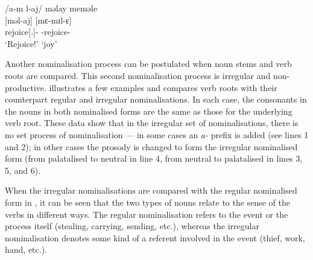 \ea \label{ex:4:19}
\textup{/a-m l-aj/ \hspace{10pt}   məlay  \hspace{70pt}    meməle}\\
\hspace{55pt}   [məl-aj]  \hspace{60pt}    [mɛ-mɪl-ɛ]\\
\hspace{55pt}      rejoice[{\twoS}.{\IMP}]-{\CL} \hspace{20pt} {\NOM}{}-rejoice-{\CL}\\
\glt \hspace{55pt} ‘Rejoice!’ \hspace{55pt}   ‘joy’
\z

Another nominalisation process can be postulated when noun stems and verb roots are compared. This second nominalisation process is irregular and non-productive.  illustrates a few examples and compares verb roots with their counterpart regular and irregular nominalisations. In each case, the consonants in the nouns in both nominalised forms are the same as those for the underlying verb root. These data show that in the irregular set of nominalisations, there is no set process of nominalisation --- in some cases an \textit{a-} prefix is added (see lines 1 and 2); in other cases the prosody is changed to form the irregular nominalised form (from palatalised to neutral in line 4, from neutral to palatalised in lines 3, 5, and 6). 

When the irregular nominalisations are compared with the regular nominalised form in , it can be seen that the two types of nouns relate to the sense of the verbs in different ways. The regular nominalisation refers to the event or the process itself (stealing, carrying, sending, etc.), whereas the irregular nominalisation denotes some kind of a referent involved in the event (thief, work, hand, etc.). 

